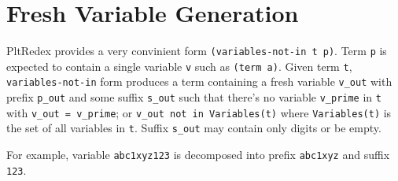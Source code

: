 \section{Fresh Variable Generation}
PltRedex provides a very convinient form \texttt{(variables-not-in t p)}. Term \texttt{p} is expected to contain a single variable \texttt{v} such as \texttt{(term a)}. Given term \texttt{t}, \texttt{variables-not-in} form produces a term containing a fresh variable \texttt{v\_out} with prefix \texttt{p\_out} and some suffix \texttt{s\_out} such that there's no variable \texttt{v\_prime} in \texttt{t} with \texttt{v\_out = v\_prime}; or \texttt{v\_out not in Variables(t)} where \texttt{Variables(t)} is the set of all variables in \texttt{t}. Suffix \texttt{s\_out} may contain only digits or be empty. 

For example, variable \texttt{abc1xyz123} is decomposed into prefix \texttt{abc1xyz} and suffix \texttt{123}.

